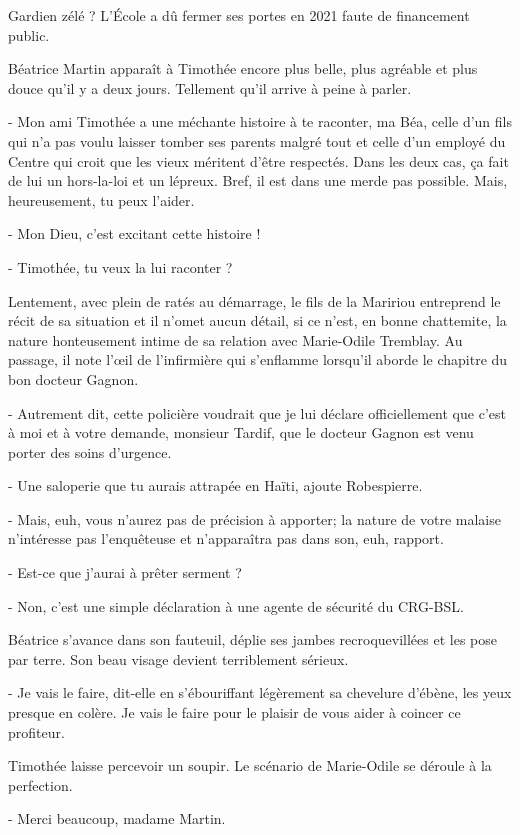 Gardien zélé ? L’École a dû fermer ses portes en 2021 faute de financement public.

Béatrice Martin apparaît à Timothée encore plus belle, plus agréable et plus douce qu’il y a deux jours. Tellement qu’il arrive à peine à parler.

- Mon ami Timothée a une méchante histoire à te raconter, ma Béa, celle d’un fils qui n’a pas voulu laisser tomber ses parents malgré tout et celle d’un employé du Centre qui croit que les vieux méritent d’être respectés. Dans les deux cas, ça fait de lui un hors-la-loi et un lépreux. Bref, il est dans une merde pas possible. Mais, heureusement, tu peux l’aider.

- Mon Dieu, c’est excitant cette histoire !

- Timothée, tu veux la lui raconter ?

Lentement, avec plein de ratés au démarrage, le fils de la Maririou entreprend le récit de sa situation et il n’omet aucun détail, si ce n’est, en bonne chattemite, la nature honteusement intime de sa relation avec Marie-Odile Tremblay. Au passage, il note l’œil de l’infirmière qui s’enflamme lorsqu’il aborde le chapitre du bon docteur Gagnon.

- Autrement dit, cette policière voudrait que je lui déclare officiellement que c’est à moi et à votre demande, monsieur Tardif, que le docteur Gagnon est venu porter des soins d’urgence.

- Une saloperie que tu aurais attrapée en Haïti, ajoute Robespierre.

- Mais, euh, vous n’aurez pas de précision à apporter; la nature de votre malaise n’intéresse pas l’enquêteuse et n’apparaîtra pas dans son, euh, rapport.

- Est-ce que j’aurai à prêter serment ?

- Non, c’est une simple déclaration à une agente de sécurité du CRG-BSL.

Béatrice s’avance dans son fauteuil, déplie ses jambes recroquevillées et les pose par terre. Son beau visage devient terriblement sérieux.

- Je vais le faire, dit-elle en s’ébouriffant légèrement sa chevelure d’ébène, les yeux presque en colère. Je vais le faire pour le plaisir de vous aider à coincer ce profiteur.

Timothée laisse percevoir un soupir. Le scénario de Marie-Odile se déroule à la perfection.

- Merci beaucoup, madame Martin.


